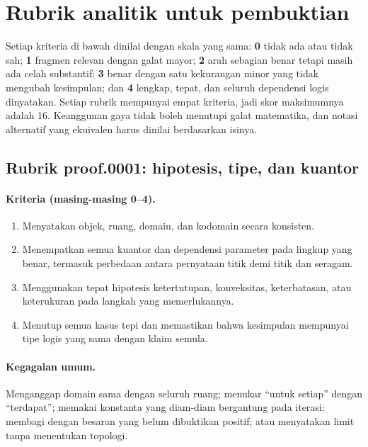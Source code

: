 
\section{Rubrik analitik untuk pembuktian}
\label{orig03:rubric}

Setiap kriteria di bawah dinilai dengan skala yang sama:
\textbf{0} tidak ada atau tidak sah;
\textbf{1} fragmen relevan dengan galat mayor;
\textbf{2} arah sebagian benar tetapi masih ada celah substantif;
\textbf{3} benar dengan satu kekurangan minor yang tidak mengubah kesimpulan;
dan \textbf{4} lengkap, tepat, dan seluruh dependensi logis dinyatakan.
Setiap rubrik mempunyai empat kriteria, jadi skor maksimumnya adalah 16.
Keanggunan gaya tidak boleh menutupi galat matematika, dan notasi alternatif
yang ekuivalen harus dinilai berdasarkan isinya.

\subsection{Rubrik proof.0001: hipotesis, tipe, dan kuantor}
\label{orig03:rubric:proof:0001}

\paragraph{Kriteria (masing-masing 0--4).}
\begin{enumerate}
  \item Menyatakan objek, ruang, domain, dan kodomain secara konsisten.
  \item Menempatkan semua kuantor dan dependensi parameter pada lingkup yang
  benar, termasuk perbedaan antara pernyataan titik demi titik dan seragam.
  \item Menggunakan tepat hipotesis ketertutupan, konveksitas, keterbatasan,
  atau keterukuran pada langkah yang memerlukannya.
  \item Menutup semua kasus tepi dan memastikan bahwa kesimpulan mempunyai
  tipe logis yang sama dengan klaim semula.
\end{enumerate}

\paragraph{Kegagalan umum.}
Menganggap domain sama dengan seluruh ruang; menukar ``untuk setiap'' dengan
``terdapat''; memakai konstanta yang diam-diam bergantung pada iterasi; membagi
dengan besaran yang belum dibuktikan positif; atau menyatakan limit tanpa
menentukan topologi.


